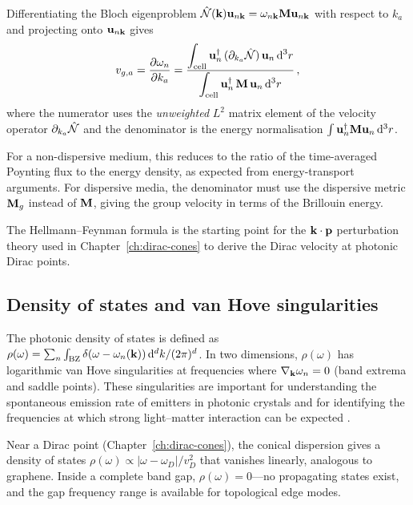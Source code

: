 Differentiating the Bloch eigenproblem
$\hat{\mathcal{N}}(\mathbf{k})\mathbf{u}_{n\mathbf{k}}
=\omega_{n\mathbf{k}}\mathbf{M}\mathbf{u}_{n\mathbf{k}}$ with respect to $k_a$
and projecting onto $\mathbf{u}_{n\mathbf{k}}$ gives
\cite{gangaraj2016berry,ozawa2018topological}
\begin{equation}\label{eq:ch4-hellmann-feynman-group}
  v_{g,a}
  = \frac{\partial\omega_n}{\partial k_a}
  = \frac{\displaystyle\int_{\mathrm{cell}}
    \mathbf{u}_n^\dagger\,(\partial_{k_a}\hat{\mathcal{N}})\,
    \mathbf{u}_n\,\mathrm{d}^3r}
  {\displaystyle\int_{\mathrm{cell}}
    \mathbf{u}_n^\dagger\,\mathbf{M}\,\mathbf{u}_n\,\mathrm{d}^3r}\,,
\end{equation}
where the numerator uses the \emph{unweighted} $L^2$ matrix element
of the velocity operator $\partial_{k_a}\hat{\mathcal{N}}$ and the denominator
is the energy normalisation $\int\mathbf{u}_n^\dagger\mathbf{M}\mathbf{u}_n\,\mathrm{d}^3r$.

For a non-dispersive medium, this reduces to the ratio of the
time-averaged Poynting flux to the energy density, as expected from
energy-transport arguments.  For dispersive media, the denominator
must use the dispersive metric $\mathbf{M}_g$ instead of $\mathbf{M}$, giving the
group velocity in terms of the Brillouin energy.

The Hellmann--Feynman formula is the starting point for the
$\mathbf{k}\cdot\mathbf{p}$ perturbation theory used in
Chapter~\ref{ch:dirac-cones} to derive the Dirac velocity at
photonic Dirac points.

\subsection{Density of states and van Hove singularities}
\label{sec:ch4-dos}

The photonic density of states is defined as
$\rho(\omega)=\sum_n\int_{\mathrm{BZ}}
\delta(\omega-\omega_n(\mathbf{k}))\,\mathrm{d}^d k/(2\pi)^d$.
In two dimensions, $\rho(\omega)$ has logarithmic van Hove
singularities at frequencies where $\nabla_{\mathbf{k}}\omega_n=0$
(band extrema and saddle points).  These singularities are important
for understanding the spontaneous emission rate of emitters
in photonic crystals and for identifying the frequencies at which
strong light--matter interaction can be expected
\cite{ozawa2018topological}.

Near a Dirac point (Chapter~\ref{ch:dirac-cones}), the conical
dispersion gives a density of states
$\rho(\omega)\propto|\omega-\omega_D|/v_D^2$ that vanishes linearly,
analogous to graphene.  Inside a complete band gap,
$\rho(\omega)=0$---no propagating states exist, and the gap frequency
range is available for topological edge modes.


